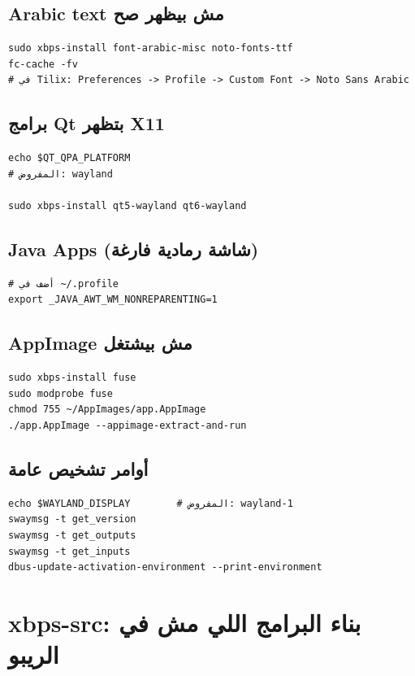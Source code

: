 \documentclass[12pt, a4paper]{report}
\begin{document}
\section{Arabic text مش بيظهر صح}
\begin{lstlisting}
sudo xbps-install font-arabic-misc noto-fonts-ttf
fc-cache -fv
# في Tilix: Preferences -> Profile -> Custom Font -> Noto Sans Arabic
\end{lstlisting}

\section{برامج Qt بتظهر X11}
\begin{lstlisting}
echo $QT_QPA_PLATFORM
# المفروض: wayland

sudo xbps-install qt5-wayland qt6-wayland
\end{lstlisting}

\section{Java Apps (شاشة رمادية فارغة)}
\begin{lstlisting}
# أضف في ~/.profile
export _JAVA_AWT_WM_NONREPARENTING=1
\end{lstlisting}

\section{AppImage مش بيشتغل}
\begin{lstlisting}
sudo xbps-install fuse
sudo modprobe fuse
chmod 755 ~/AppImages/app.AppImage
./app.AppImage --appimage-extract-and-run
\end{lstlisting}

\section{أوامر تشخيص عامة}
\begin{lstlisting}
echo $WAYLAND_DISPLAY        # المفروض: wayland-1
swaymsg -t get_version
swaymsg -t get_outputs
swaymsg -t get_inputs
dbus-update-activation-environment --print-environment
\end{lstlisting}

\chapter{xbps-src: بناء البرامج اللي مش في الريبو}
\end{document}
